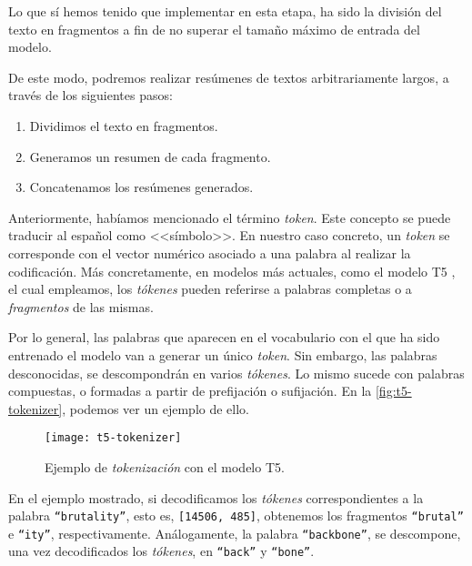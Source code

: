 Lo que sí hemos tenido que implementar en esta etapa, ha sido la división del texto en fragmentos a fin de no superar el tamaño máximo de entrada del modelo.

De este modo, podremos realizar resúmenes de textos arbitrariamente largos, a través de los siguientes pasos:

\vspace{-\baselineskip}
\begin{enumerate}
	\tightlist
	\item Dividimos el texto en fragmentos.
	\item Generamos un resumen de cada fragmento.
	\item Concatenamos los resúmenes generados.
\end{enumerate}
\vspace{-0.3cm}

Anteriormente, habíamos mencionado el término \emph{token}. Este concepto se puede traducir al español como <<símbolo>>. En nuestro caso concreto, un \emph{token} se corresponde con el vector numérico asociado a una palabra al realizar la codificación. Más concretamente, en modelos más actuales, como el modelo T5 \cite{raffel19}, el cual empleamos, los \emph{tókenes} pueden referirse a palabras completas o a \emph{fragmentos} de las mismas.

Por lo general, las palabras que aparecen en el vocabulario con el que ha sido entrenado el modelo van a generar un único \emph{token}. Sin embargo, las palabras desconocidas, se descompondrán en varios \emph{tókenes}. Lo mismo sucede con palabras compuestas, o formadas a partir de prefijación o sufijación. En la \autoref{fig:t5-tokenizer}, podemos ver un ejemplo de ello.

\newpage

\begin{figure}[h]
	\centering
	\texttt{[image: t5-tokenizer]}
	\caption{Ejemplo de \emph{tokenización} con el modelo T5.}
	\label{fig:t5-tokenizer}
\end{figure}

\vspace{-0.5cm}
En el ejemplo mostrado, si decodificamos los \emph{tókenes} correspondientes a la palabra \texttt{``brutality''}, esto es, \texttt{[14506, 485]}, obtenemos los fragmentos \texttt{``brutal''} e \texttt{``ity''}, respectivamente. Análogamente, la palabra \texttt{``backbone''}, se descompone, una vez decodificados los \emph{tókenes}, en \texttt{``back''} y \texttt{``bone''}.

